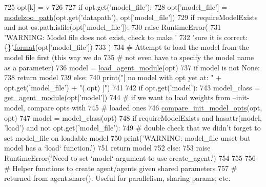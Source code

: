 \begin{DoxyCode}
725                 opt[k] = v
726 
727     \textcolor{keywordflow}{if} opt.get(\textcolor{stringliteral}{'model\_file'}):
728         opt[\textcolor{stringliteral}{'model\_file'}] = \hyperlink{namespaceparlai_1_1agents_1_1legacy__agents_1_1seq2seq_1_1utils__v0_a5fbd3301b67f00d6d146fb01c7cd7626}{modelzoo\_path}(opt.get(\textcolor{stringliteral}{'datapath'}), opt[\textcolor{stringliteral}{'model\_file'}])
729         \textcolor{keywordflow}{if} requireModelExists \textcolor{keywordflow}{and} \textcolor{keywordflow}{not} os.path.isfile(opt[\textcolor{stringliteral}{'model\_file'}]):
730             \textcolor{keywordflow}{raise} RuntimeError(
731                 \textcolor{stringliteral}{'WARNING: Model file does not exist, check to make '}
732                 \textcolor{stringliteral}{'sure it is correct: \{\}'}.\hyperlink{namespaceparlai_1_1chat__service_1_1services_1_1messenger_1_1shared__utils_a32e2e2022b824fbaf80c747160b52a76}{format}(opt[\textcolor{stringliteral}{'model\_file'}])
733             )
734         \textcolor{comment}{# Attempt to load the model from the model file first (this way we do}
735         \textcolor{comment}{# not even have to specify the model name as a parameter)}
736         model = \hyperlink{namespaceparlai_1_1core_1_1agents_a213df46dd21144eb4c056bb58c294c5d}{load\_agent\_module}(opt)
737         \textcolor{keywordflow}{if} model \textcolor{keywordflow}{is} \textcolor{keywordflow}{not} \textcolor{keywordtype}{None}:
738             \textcolor{keywordflow}{return} model
739         \textcolor{keywordflow}{else}:
740             print(\textcolor{stringliteral}{"[ no model with opt yet at: "} + opt.get(\textcolor{stringliteral}{'model\_file'}) + \textcolor{stringliteral}{"(.opt) ]"})
741 
742     \textcolor{keywordflow}{if} opt.get(\textcolor{stringliteral}{'model'}):
743         model\_class = \hyperlink{namespaceparlai_1_1core_1_1agents_a14a9d134d76ffd0509e50703d0f2c949}{get\_agent\_module}(opt[\textcolor{stringliteral}{'model'}])
744         \textcolor{comment}{# if we want to load weights from --init-model, compare opts with}
745         \textcolor{comment}{# loaded ones}
746         \hyperlink{namespaceparlai_1_1core_1_1agents_a7eb0ec391b94a2adc51acdf8d2a35a68}{compare\_init\_model\_opts}(opt, opt)
747         model = model\_class(opt)
748         \textcolor{keywordflow}{if} requireModelExists \textcolor{keywordflow}{and} hasattr(model, \textcolor{stringliteral}{'load'}) \textcolor{keywordflow}{and} \textcolor{keywordflow}{not} opt.get(\textcolor{stringliteral}{'model\_file'}):
749             \textcolor{comment}{# double check that we didn't forget to set model\_file on loadable model}
750             print(\textcolor{stringliteral}{'WARNING: model\_file unset but model has a `load` function.'})
751         \textcolor{keywordflow}{return} model
752     \textcolor{keywordflow}{else}:
753         \textcolor{keywordflow}{raise} RuntimeError(\textcolor{stringliteral}{'Need to set `model` argument to use create\_agent.'})
754 
755 
756 \textcolor{comment}{# Helper functions to create agent/agents given shared parameters}
757 \textcolor{comment}{# returned from agent.share(). Useful for parallelism, sharing params, etc.}
\end{DoxyCode}
